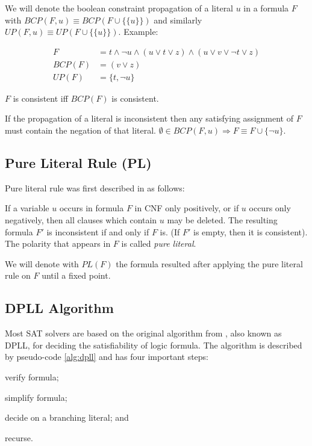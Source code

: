 We will denote the boolean constraint propagation of a literal $u$ in a
formula $F$ with $BCP(F, u) \equiv BCP(F \cup \{\{ u \}\})$
and similarly $UP(F, u) \equiv UP(F \cup \{\{ u \}\})$. Example:

\begin{align}
  F &= t \land \neg u \land (u \lor t \lor z) \land (u \lor v \lor \neg t \lor z) \\
  BCP(F) &= (v \lor z) \\
  UP(F) &= \{ t, \neg u \}
\end{align}

\begin{myprop}
  $F$ is consistent iff $BCP(F)$ is consistent.
\end{myprop}

\begin{myprop}
  If the propagation of a literal is inconsistent then any satisfying
  assignment of $F$ must contain the negation of that literal.
  $\emptyset \in BCP(F, u) \Rightarrow F \equiv F \cup \{\neg u\}$.
\end{myprop}


\subsection{Pure Literal Rule (PL)}
\label{ssec:pl}

Pure literal rule was first described in \cite{Davis:1960:CPQ:321033.321034}
as follows:

\begin{mydef}
  If a variable $u$ occurs in formula $F$ in CNF only positively, or
  if $u$ occurs only negatively, then all clauses which contain $u$
  may be deleted. The resulting formula $F'$ is inconsistent
  if and only if $F$ is. (If $F'$ is empty, then it is consistent).
  The polarity that appears in $F$ is called \emph{pure literal}.
\end{mydef}

We will denote with $PL(F)$ the formula resulted after applying
the pure literal rule on $F$ until a fixed point.


\subsection{DPLL Algorithm}
\label{ssec:dpll}

Most SAT solvers are based on the original algorithm from
\cite{Davis:1962:MPT:368273.368557}, also known as DPLL, for deciding
the satisfiability of logic formula.  The algorithm is described
by pseudo-code \ref{alg:dpll} and has four important steps:
\begin{inparaenum}[1)]
  \item verify formula;
  \item simplify formula;
  \item decide on a branching literal; and
  \item recurse.
\end{inparaenum}

